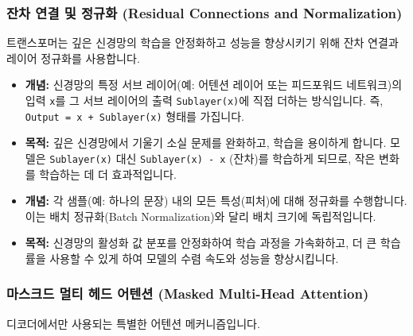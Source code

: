 \documentclass[11pt,a4paper]{article}
\theoremstyle{definition}
\begin{document}
\subsubsection{잔차 연결 및 정규화 (Residual Connections and Normalization)}
트랜스포머는 깊은 신경망의 학습을 안정화하고 성능을 향상시키기 위해 잔차 연결과 레이어 정규화를 사용합니다.

\begin{tcolorbox}[mybox, title={잔차 연결 (Residual Connections, Shortcut Connections)}]
\begin{itemize}
    \item \textbf{개념:} 신경망의 특정 서브 레이어(예: 어텐션 레이어 또는 피드포워드 네트워크)의 입력 \texttt{x}를 그 서브 레이어의 출력 \texttt{Sublayer(x)}에 직접 더하는 방식입니다. 즉, \texttt{Output = x + Sublayer(x)} 형태를 가집니다.
    \item \textbf{목적:} 깊은 신경망에서 기울기 소실 문제를 완화하고, 학습을 용이하게 합니다. 모델은 \texttt{Sublayer(x)} 대신 \texttt{Sublayer(x) - x} (잔차)를 학습하게 되므로, 작은 변화를 학습하는 데 더 효과적입니다.
\end{itemize}
\end{tcolorbox}

\begin{tcolorbox}[mybox, title={레이어 정규화 (Layer Normalization)}]
\begin{itemize}
    \item \textbf{개념:} 각 샘플(예: 하나의 문장) 내의 모든 특성(피처)에 대해 정규화를 수행합니다. 이는 배치 정규화(Batch Normalization)와 달리 배치 크기에 독립적입니다.
    \item \textbf{목적:} 신경망의 활성화 값 분포를 안정화하여 학습 과정을 가속화하고, 더 큰 학습률을 사용할 수 있게 하여 모델의 수렴 속도와 성능을 향상시킵니다.
\end{itemize}
\end{tcolorbox}

\subsubsection{마스크드 멀티 헤드 어텐션 (Masked Multi-Head Attention)}
디코더에서만 사용되는 특별한 어텐션 메커니즘입니다.
\end{document}
